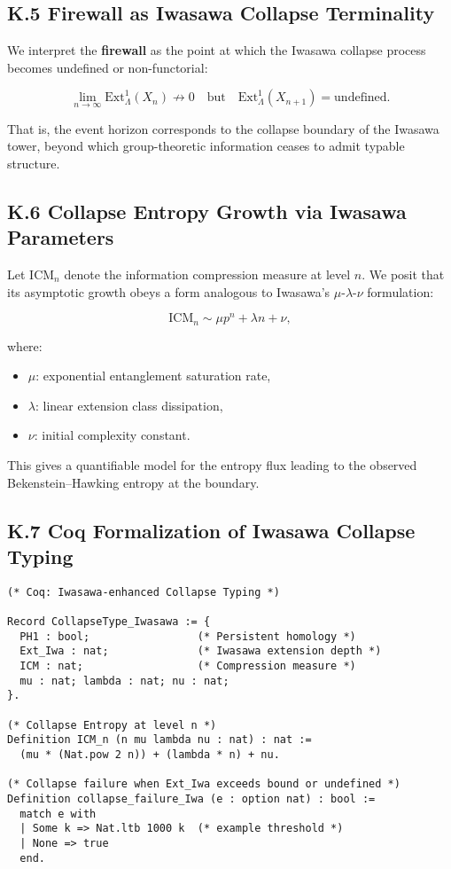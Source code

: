 \documentclass[11pt]{article}
\begin{document}
\subsection*{K.5 Firewall as Iwasawa Collapse Terminality}

We interpret the \textbf{firewall} as the point at which the Iwasawa collapse process becomes undefined or non-functorial:

\[
\lim_{n \to \infty} \mathrm{Ext}^1_{\Lambda}(X_n) \not\rightarrow 0
\quad \text{but} \quad
\mathrm{Ext}^1_{\Lambda}(X_{n+1}) = \text{undefined}.
\]

That is, the event horizon corresponds to the collapse boundary of the Iwasawa tower, beyond which group-theoretic information ceases to admit typable structure.

\subsection*{K.6 Collapse Entropy Growth via Iwasawa Parameters}

Let \( \mathrm{ICM}_n \) denote the information compression measure at level \( n \).  
We posit that its asymptotic growth obeys a form analogous to Iwasawa’s 
\( \mu \)-\( \lambda \)-\( \nu \) formulation:

\[
\mathrm{ICM}_n \sim \mu p^n + \lambda n + \nu,
\]

where:

\begin{itemize}
  \item \( \mu \): exponential entanglement saturation rate,
  \item \( \lambda \): linear extension class dissipation,
  \item \( \nu \): initial complexity constant.
\end{itemize}

This gives a quantifiable model for the entropy flux leading to the observed Bekenstein–Hawking entropy at the boundary.

\subsection*{K.7 Coq Formalization of Iwasawa Collapse Typing}

\begin{lstlisting}
(* Coq: Iwasawa-enhanced Collapse Typing *)

Record CollapseType_Iwasawa := {
  PH1 : bool;                 (* Persistent homology *)
  Ext_Iwa : nat;              (* Iwasawa extension depth *)
  ICM : nat;                  (* Compression measure *)
  mu : nat; lambda : nat; nu : nat;
}.

(* Collapse Entropy at level n *)
Definition ICM_n (n mu lambda nu : nat) : nat :=
  (mu * (Nat.pow 2 n)) + (lambda * n) + nu.

(* Collapse failure when Ext_Iwa exceeds bound or undefined *)
Definition collapse_failure_Iwa (e : option nat) : bool :=
  match e with
  | Some k => Nat.ltb 1000 k  (* example threshold *)
  | None => true
  end.
\end{lstlisting}
\end{document}
